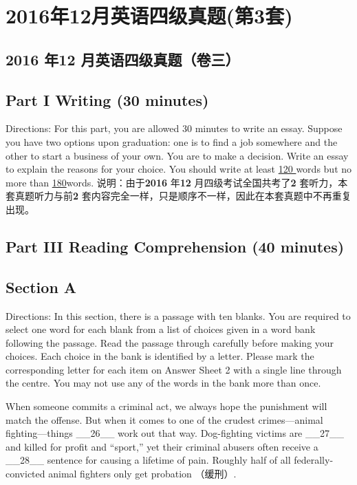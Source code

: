 \documentclass[UTF8,11pt]{ctexart}
\begin{document}
\section*{2016年12月英语四级真题(第3套)}
\subsection*{\textbf{2016 年12 月英语四级真题（卷三）}}


\subsection*{\textbf{Part I} \textbf{Writing} \textbf{(30 minutes)}}


Directions: For this part, you are allowed 30 minutes to write an essay. Suppose you have two options upon graduation: one is to find a job somewhere and the other to start a business of your own. You are to make a decision. Write an essay to explain the reasons for your choice. You should write at least \uline{120 }words but no more than \uline{180}words. 说明：由于\textbf{2016} 年\textbf{12} 月四级考试全国共考了\textbf{2} 套听力，本套真题听力与前\textbf{2} 套内容完全一样，只是顺序不一样，因此在本套真题中不再重复出现。


\subsection*{\textbf{Part III Reading Comprehension (40 minutes)}}


\subsection*{\textbf{Section A}}


Directions: In this section, there is a passage with ten blanks. You are required to select one word for each blank from a list of choices given in a word bank following the passage. Read the passage through carefully before making your choices. Each choice in the bank is identified by a letter. Please mark the corresponding letter for each item on Answer Sheet 2 with a single line through the centre. You may not use any of the words in the bank more than once.


When someone commits a criminal act, we always hope the punishment will match the offense. But when it comes to one of the crudest crimes—animal fighting—things \_\_26\_\_ work out that way. Dog-fighting victims are \_\_27\_\_ and killed for profit and “sport,” yet their criminal abusers often receive a \_\_28\_\_ sentence for causing a lifetime of pain. Roughly half of all federally-convicted animal fighters only get probation （缓刑）.
\end{document}
